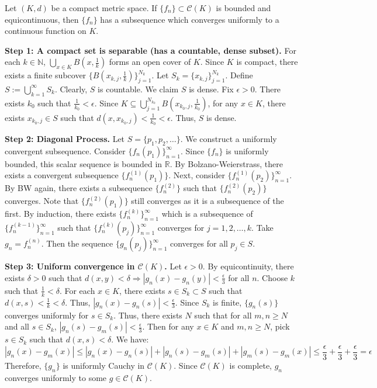 \begin{theorem}
Let $(K, d)$ be a compact metric space. If $\{f_n\} \subset \mathcal{C}(K)$ is bounded and equicontinuous, then $\{f_n\}$ has a subsequence which converges uniformly to a continuous function on $K$.
\end{theorem}
\begin{pfbox}
\textbf{Step 1: A compact set is separable (has a countable, dense subset).}
For each $k \in \mathbb{N}$, $\displaystyle\bigcup_{x \in K} B\left(x, \frac{1}{k}\right)$ forms an open cover of $K$. Since $K$ is compact, there exists a finite subcover $\{B(x_{k,j}, \frac{1}{k})\}_{j=1}^{N_k}$. Let $S_k = \{x_{k,j}\}_{j=1}^{N_k}$. Define $S := \displaystyle\bigcup_{k=1}^\infty S_k$. Clearly, $S$ is countable.
We claim $S$ is dense. Fix $\epsilon > 0$. There exists $k_0$ such that $\frac{1}{k_0} < \epsilon$. Since $K \subseteq \displaystyle\bigcup_{j=1}^{N_{k_0}} B(x_{k_0,j}, \frac{1}{k_0})$, for any $x \in K$, there exists $x_{k_0,j} \in S$ such that $d(x, x_{k_0,j}) < \frac{1}{k_0} < \epsilon$. Thus, $S$ is dense.

\textbf{Step 2: Diagonal Process.}
Let $S = \{p_1, p_2, \dots\}$. We construct a uniformly convergent subsequence.
Consider $\{f_n(p_1)\}_{n=1}^\infty$. Since $\{f_n\}$ is uniformly bounded, this scalar sequence is bounded in $\mathbb{R}$. By Bolzano-Weierstrass, there exists a convergent subsequence $\{f_n^{(1)}(p_1)\}$.
Next, consider $\{f_n^{(1)}(p_2)\}_{n=1}^\infty$. By BW again, there exists a subsequence $\{f_n^{(2)}\}$ such that $\{f_n^{(2)}(p_2)\}$ converges. Note that $\{f_n^{(2)}(p_1)\}$ still converges as it is a subsequence of the first.
By induction, there exists $\{f_n^{(k)}\}_{n=1}^\infty$ which is a subsequence of $\{f_n^{(k-1)}\}_{n=1}^\infty$ such that $\{f_n^{(k)}(p_j)\}_{n=1}^\infty$ converges for $j = 1, 2, \dots, k$.
Take $g_n = f_n^{(n)}$. Then the sequence $\{g_n(p_j)\}_{n=1}^\infty$ converges for all $p_j \in S$.

\textbf{Step 3: Uniform convergence in $\mathcal{C}(K)$.}
Let $\epsilon > 0$. By equicontinuity, there exists $\delta > 0$ such that $d(x,y) < \delta \Rightarrow |g_n(x) - g_n(y)| < \frac{\epsilon}{3}$ for all $n$.
Choose $k$ such that $\frac{1}{k} < \delta$. For each $x \in K$, there exists $s \in S_k \subset S$ such that $d(x, s) < \frac{1}{k} < \delta$. Thus, $|g_n(x) - g_n(s)| < \frac{\epsilon}{3}$.
Since $S_k$ is finite, $\{g_n(s)\}$ converges uniformly for $s \in S_k$. Thus, there exists $N$ such that for all $m, n \ge N$ and all $s \in S_k$, $|g_n(s) - g_m(s)| < \frac{\epsilon}{3}$.
Then for any $x \in K$ and $m, n \ge N$, pick $s \in S_k$ such that $d(x,s) < \delta$. We have:
$$|g_n(x) - g_m(x)| \le |g_n(x) - g_n(s)| + |g_n(s) - g_m(s)| + |g_m(s) - g_m(x)| \le \frac{\epsilon}{3} + \frac{\epsilon}{3} + \frac{\epsilon}{3} = \epsilon$$
Therefore, $\{g_n\}$ is uniformly Cauchy in $\mathcal{C}(K)$. Since $\mathcal{C}(K)$ is complete, $g_n$ converges uniformly to some $g \in \mathcal{C}(K)$.
\end{pfbox}


